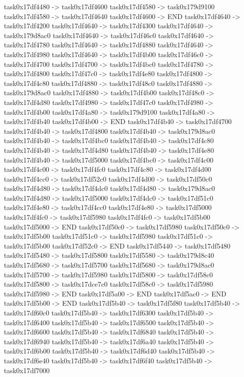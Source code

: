 {	task0x17df4480 -> task0x17df4600
	task0x17df4580 -> task0x179d9100
	task0x17df4580 -> task0x17df4640
	task0x17df4600 -> END
	task0x17df4640 -> task0x17df4200
	task0x17df4640 -> task0x17df4300
	task0x17df4640 -> task0x179d8ac0
	task0x17df4640 -> task0x17df46c0
	task0x17df4640 -> task0x17df4780
	task0x17df4640 -> task0x17df4880
	task0x17df4640 -> task0x17df4980
	task0x17df4640 -> task0x17df4b00
	task0x17df46c0 -> task0x17df4700
	task0x17df4700 -> task0x17df4bc0
	task0x17df4780 -> task0x17df4800
	task0x17df47c0 -> task0x17df4e80
	task0x17df4800 -> task0x17df4c80
	task0x17df4880 -> task0x17df48c0
	task0x17df4880 -> task0x179d8ac0
	task0x17df4880 -> task0x17df4b00
	task0x17df48c0 -> task0x17df4d80
	task0x17df4980 -> task0x17df47c0
	task0x17df4980 -> task0x17df4b00
	task0x17df4a80 -> task0x179d9100
	task0x17df4a80 -> task0x17df4b40
	task0x17df4b00 -> END
	task0x17df4b40 -> task0x17df4700
	task0x17df4b40 -> task0x17df4800
	task0x17df4b40 -> task0x179d8ac0
	task0x17df4b40 -> task0x17df4bc0
	task0x17df4b40 -> task0x17df4c80
	task0x17df4b40 -> task0x17df4d80
	task0x17df4b40 -> task0x17df4e80
	task0x17df4b40 -> task0x17df5000
	task0x17df4bc0 -> task0x17df4c00
	task0x17df4c00 -> task0x17df4fc0
	task0x17df4c80 -> task0x17df4d00
	task0x17df4cc0 -> task0x17df52c0
	task0x17df4d00 -> task0x17df50c0
	task0x17df4d80 -> task0x17df4dc0
	task0x17df4d80 -> task0x179d8ac0
	task0x17df4d80 -> task0x17df5000
	task0x17df4dc0 -> task0x17df51c0
	task0x17df4e80 -> task0x17df4cc0
	task0x17df4e80 -> task0x17df5000
	task0x17df4fc0 -> task0x17df5980
	task0x17df4fc0 -> task0x17df5b00
	task0x17df5000 -> END
	task0x17df50c0 -> task0x17df5980
	task0x17df50c0 -> task0x17df5b00
	task0x17df51c0 -> task0x17df5980
	task0x17df51c0 -> task0x17df5b00
	task0x17df52c0 -> END
	task0x17df5440 -> task0x17df5480
	task0x17df5480 -> task0x17df5800
	task0x17df5580 -> task0x179d8c40
	task0x17df5680 -> task0x17df5700
	task0x17df5680 -> task0x179d8ac0
	task0x17df5700 -> task0x17df5980
	task0x17df5800 -> task0x17df58c0
	task0x17df5800 -> task0x17dce7c0
	task0x17df58c0 -> task0x17df5980
	task0x17df5980 -> END
	task0x17df5a00 -> END
	task0x17df5ac0 -> END
	task0x17df5b00 -> END
	task0x17df5b40 -> task0x17df5f80
	task0x17df5b40 -> task0x17df60c0
	task0x17df5b40 -> task0x17df6300
	task0x17df5b40 -> task0x17df6400
	task0x17df5b40 -> task0x17df6500
	task0x17df5b40 -> task0x17df6600
	task0x17df5b40 -> task0x17df6840
	task0x17df5b40 -> task0x17df6940
	task0x17df5b40 -> task0x17df6a40
	task0x17df5b40 -> task0x17df6b00
	task0x17df5b40 -> task0x17df6d40
	task0x17df5b40 -> task0x17df6e40
	task0x17df5b40 -> task0x17df6f40
	task0x17df5b40 -> task0x17df7000
}
